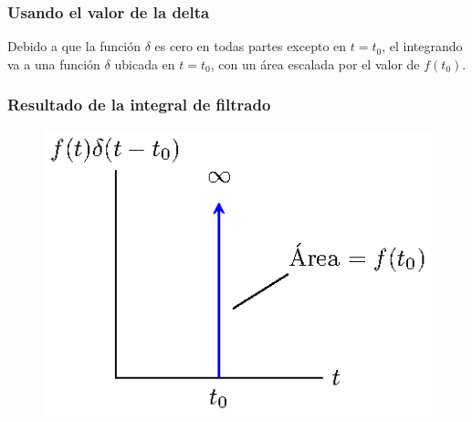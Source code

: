 \documentclass[12pt]{beamer}
\begin{document}
\begin{frame}
\frametitle{Usando el valor de la delta}
Debido a que la función $\delta$ es cero en todas partes excepto en $t = t_{0}$, el integrando va a una función $\delta$ ubicada en $t = t_{0}$, con un área escalada por el valor de $f (t_{0})$.
\end{frame}
\begin{frame}
\frametitle{Resultado de la integral de filtrado}
\begin{figure}[H]
    \centering
    \includegraphics[scale=1]{Imagenes/plot_propiedad_desplazamiento_03.eps}
\end{figure}
\end{frame}
\end{document}
